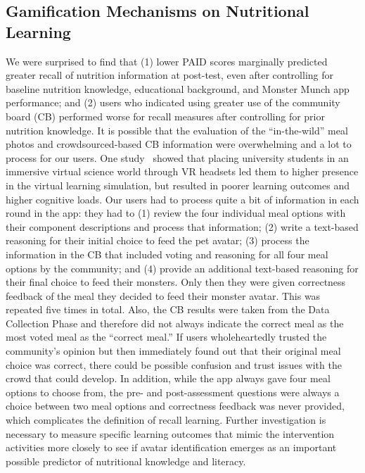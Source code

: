\subsection{Gamification Mechanisms on Nutritional Learning}
We were surprised to find that (1) lower PAID scores marginally predicted greater recall of nutrition information at post-test, even after controlling for baseline nutrition knowledge, educational background, and Monster Munch app performance; and (2) users who indicated using greater use of the community board (CB) performed worse for recall measures after controlling for prior nutrition knowledge.  
It is possible that the evaluation of the ``in-the-wild'' meal photos and crowdsourced-based CB information were overwhelming and a lot to process for our users. 
One study~\cite{makransky2019adding} showed that placing university students in an immersive virtual science world through VR headsets led them to higher presence in the virtual learning simulation, but resulted in poorer learning outcomes and higher cognitive loads. 
Our users had to process quite a bit of information in each round in the app: they had to (1) review the four individual meal options with their component descriptions
and process that information; (2) write a text-based reasoning for their initial choice to feed the pet avatar; (3) process the information in the CB that included voting and reasoning for all four meal options by the community; and (4) provide an additional text-based reasoning for their final choice to feed their monsters.
Only then they were given correctness feedback of the meal they decided to feed their monster avatar. This was repeated five times in total. Also, the CB results were taken from the Data Collection Phase and therefore did not always indicate the correct meal as the most voted meal as the ``correct meal.'' If users wholeheartedly trusted the community's opinion but then immediately found out that their original meal choice was correct, there could be possible confusion and trust issues with the crowd that could develop. 
In addition, while the app always gave four meal options to choose from, the pre- and post-assessment questions were always a choice between two meal options and correctness feedback was never provided, which complicates the definition of recall learning. 
Further investigation is necessary to measure specific learning outcomes that mimic the intervention activities more closely to see if avatar identification emerges as an important possible predictor of nutritional knowledge and literacy.

